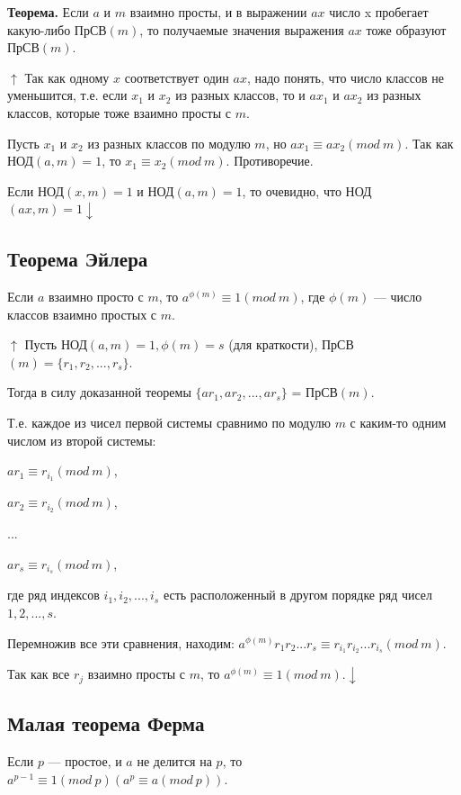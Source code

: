 \documentclass{article}
\begin{document}
        	\textbf{Теорема.} Если $a$ и $m$ взаимно просты, и в выражении $ax$ число x пробегает какую-либо ПрСВ$(m)$, то получаемые значения выражения $ax$ тоже образуют ПрСВ$(m)$.
            
            $\uparrow$ Так как одному $x$ соответствует один $ax$, надо понять, что число классов не уменьшится, т.е. если $x_1$ и $x_2$ из разных классов, то и $ax_1$ и $ax_2$ из разных классов, которые тоже взаимно просты с $m$.
            
            Пусть $x_1$ и $x_2$ из разных классов по модулю $m$, но $ax_1 \equiv ax_2(mod\ m)$. Так как НОД$(a, m) = 1$, то $x_1 \equiv x_2(mod\ m)$. Противоречие.
            
            Если НОД$(x, m) = 1$ и НОД$(a, m) = 1$, то очевидно, что НОД$(ax, m) = 1 \downarrow$
        
        \subsection{Теорема Эйлера}
			Если $a$ взаимно просто с $m$, то $a^{\phi(m)} \equiv 1(mod\ m)$, где $\phi(m)$ --- число классов взаимно простых с $m$.
            
            $\uparrow$ Пусть НОД$(a, m) = 1, \phi(m) = s$ (для краткости), ПрСВ$(m)=\{r_1, r_2, ..., r_s\}$.
            
            Тогда в силу доказанной теоремы $\{ar_1, ar_2, ..., ar_s\}$ = ПрСВ$(m)$.
            
            Т.е. каждое из чисел первой системы сравнимо по модулю $m$ с каким-то одним числом из второй системы:
            
            $ar_1 \equiv r_{i_1}(mod\ m)$,
            
            $ar_2 \equiv r_{i_2}(mod\ m)$,
            
            ...
            
            $ar_s \equiv r_{i_s}(mod\ m)$,
            
            где ряд индексов $i_1, i_2, ..., i_s$ есть расположенный в другом порядке ряд чисел $1, 2, ..., s$.
            
            Перемножив все эти сравнения, находим: $a^{\phi(m)}r_1r_2...r_s \equiv r_{i_1}r_{i_2}...r_{i_s}(mod\ m)$.
            
            Так как все $r_j$ взаимно просты с $m$, то $a^{\phi(m)} \equiv 1(mod\ m). \downarrow$
            
        \subsection{Малая теорема Ферма}
        	Если $p$ --- простое, и $a$ не делится на $p$, то $a^{p-1} \equiv 1(mod\ p)(a^p \equiv a(mod\ p)).$      
            
\end{document}
